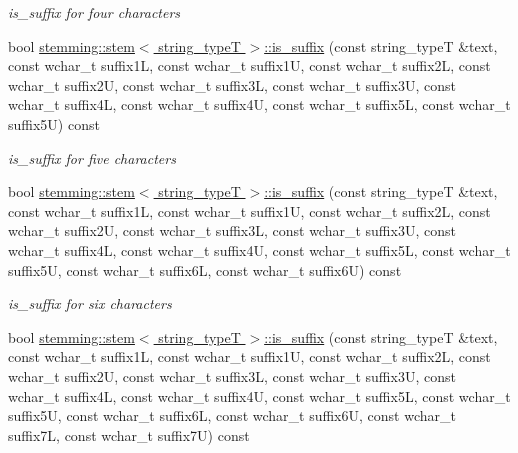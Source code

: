 \begin{DoxyCompactItemize}
\begin{DoxyCompactList}\small\item\em is\-\_\-suffix for four characters \end{DoxyCompactList}\item 
\hypertarget{group___stemming_ga001757aa7530b8acea05df8405def025}{bool \hyperlink{group___stemming_ga001757aa7530b8acea05df8405def025}{stemming\-::stem$<$ string\-\_\-type\-T $>$\-::is\-\_\-suffix} (const string\-\_\-type\-T \&text, const wchar\-\_\-t suffix1\-L, const wchar\-\_\-t suffix1\-U, const wchar\-\_\-t suffix2\-L, const wchar\-\_\-t suffix2\-U, const wchar\-\_\-t suffix3\-L, const wchar\-\_\-t suffix3\-U, const wchar\-\_\-t suffix4\-L, const wchar\-\_\-t suffix4\-U, const wchar\-\_\-t suffix5\-L, const wchar\-\_\-t suffix5\-U) const }\label{group___stemming_ga001757aa7530b8acea05df8405def025}

\begin{DoxyCompactList}\small\item\em is\-\_\-suffix for five characters \end{DoxyCompactList}\item 
\hypertarget{group___stemming_gabe83f7592028b43f5cec9ce35ae1d9df}{bool \hyperlink{group___stemming_gabe83f7592028b43f5cec9ce35ae1d9df}{stemming\-::stem$<$ string\-\_\-type\-T $>$\-::is\-\_\-suffix} (const string\-\_\-type\-T \&text, const wchar\-\_\-t suffix1\-L, const wchar\-\_\-t suffix1\-U, const wchar\-\_\-t suffix2\-L, const wchar\-\_\-t suffix2\-U, const wchar\-\_\-t suffix3\-L, const wchar\-\_\-t suffix3\-U, const wchar\-\_\-t suffix4\-L, const wchar\-\_\-t suffix4\-U, const wchar\-\_\-t suffix5\-L, const wchar\-\_\-t suffix5\-U, const wchar\-\_\-t suffix6\-L, const wchar\-\_\-t suffix6\-U) const }\label{group___stemming_gabe83f7592028b43f5cec9ce35ae1d9df}

\begin{DoxyCompactList}\small\item\em is\-\_\-suffix for six characters \end{DoxyCompactList}\item 
\hypertarget{group___stemming_ga79f18e256337d37054c80de470660a65}{bool \hyperlink{group___stemming_ga79f18e256337d37054c80de470660a65}{stemming\-::stem$<$ string\-\_\-type\-T $>$\-::is\-\_\-suffix} (const string\-\_\-type\-T \&text, const wchar\-\_\-t suffix1\-L, const wchar\-\_\-t suffix1\-U, const wchar\-\_\-t suffix2\-L, const wchar\-\_\-t suffix2\-U, const wchar\-\_\-t suffix3\-L, const wchar\-\_\-t suffix3\-U, const wchar\-\_\-t suffix4\-L, const wchar\-\_\-t suffix4\-U, const wchar\-\_\-t suffix5\-L, const wchar\-\_\-t suffix5\-U, const wchar\-\_\-t suffix6\-L, const wchar\-\_\-t suffix6\-U, const wchar\-\_\-t suffix7\-L, const wchar\-\_\-t suffix7\-U) const }\label{group___stemming_ga79f18e256337d37054c80de470660a65}


\end{DoxyCompactItemize}
